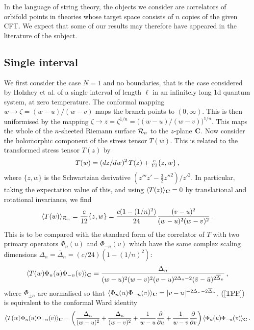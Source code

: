 \documentclass[preprint,aps]{revtex4}
\def\ffrac#1#2{\textstyle{#1\over#2}\displaystyle}
\begin{document}
In the language of string theory, the objects we consider are
correlators of orbifold points in theories whose target
space consists of $n$ copies of the given CFT. We expect that some of
our results may therefore have appeared in the literature of the subject.

\subsection{Single interval}
We first consider the case $N=1$ and no boundaries, that is the case
considered by Holzhey et al.\cite{Holzhey} of
a single interval of length $\ell$ in an infinitely long 1d quantum
system, at zero temperature.
The conformal mapping
$w\to\zeta=(w-u)/(w-v)$ maps the branch points to $(0,\infty)$. This is
then uniformised by the mapping $\zeta\to z=\zeta^{1/n}=
\big((w-u)/(w-v)\big)^{1/n}$. This maps the whole of the $n$-sheeted
Riemann surface ${\cal R}_n$ to the $z$-plane $\bf C$.
Now consider the holomorphic component
of the stress tensor $T(w)$. This is related to the transformed stress
tensor $T(z)$ by\cite{BPZ}
\begin{equation}
\label{schwartz}
T(w)=(dz/dw)^2\,T(z)+\ffrac c{12}\{z,w\}\,,
\end{equation}
where $\{z,w\}$ is the Schwartzian derivative
$(z'''z'-\frac32{z''}^2)/{z'}^2$.
In particular, taking the expectation value of this, and using $\langle
T(z)\rangle_{\bf C}=0$ by translational and rotational invariance, we find
\begin{equation}
\langle T(w)\rangle_{{\cal R}_n}=\frac c{12}\{z,w\}=
{c(1-(1/n)^2)\over 24}{(v-u)^2\over(w-u)^2(w-v)^2}\,.
\end{equation}
This is to be compared with the standard form\cite{BPZ} of the correlator of
$T$ with two primary operators $\Phi_n(u)$ and $\Phi_{-n}(v)$ which have
the same complex scaling dimensions $\Delta_n=\overline\Delta_n=
(c/24)(1-(1/n)^2)$:
\begin{equation}
\label{TPP}
\langle T(w)\Phi_n(u)\Phi_{-n}(v)\rangle_{\bf C}=
{\Delta_n\over (w-u)^2(w-v)^2(v-u)^{2\Delta_n-2}
(\bar v-\bar u)^{2\overline\Delta_n}}\,,
\end{equation}
where $\Phi_{\pm n}$ are normalised so that
$\langle \Phi_n(u)\Phi_{-n}(v)\rangle_{\bf C}=|v-u|^{-2\Delta_n
-2\overline\Delta_n}$. (\ref{TPP}) is equivalent to the
conformal Ward identity\cite{BPZ}
\begin{equation}
\label{WI}
\langle T(w)\Phi_n(u)\Phi_{-n}(v)\rangle_{\bf C}=
\left({\Delta_n\over(w-u)^2}+{\Delta_n\over(w-v)^2}
+{1\over w-u}{\partial\over\partial u}+
{1\over w-v}{\partial\over\partial v}\right)
\langle\Phi_n(u)\Phi_{-n}(v)\rangle_{\bf C}\,.
\end{equation}
\end{document}
